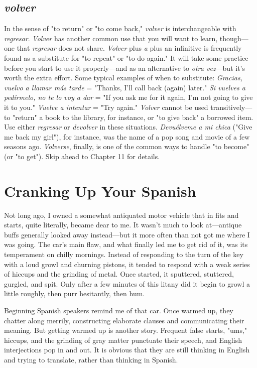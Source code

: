 \documentclass[14pt,a4paper,oneside]{memoir}
\begin{document}
\section{\emph{volver}}

In the sense of "to return" or "to come back," \emph{volver} is interchangeable with \emph{regresar}. \emph{Volver} has another common use that you
will want to learn, though---one that \emph{regresar} does not share. \emph{Volver}
plus \emph{a} plus an infinitive is frequently found as a substitute for "to repeat" or "to do again." It will take some practice before you start to
use it properly---and as an alternative to \emph{otra vez}---but it's worth the
extra effort. Some typical examples of when to substitute: \emph{Gracias,
	vuelvo a llamar más tarde} = "Thanks, I'll call back (again) later." \emph{Si
	vuelves a pedírmelo, no te lo voy a dar} = "If you ask me for it again,
I'm not going to give it to you." \emph{Vuelve a intentar} = "Try again."
\emph{Volver} cannot be used transitively---to "return" a book to the library, for
instance, or "to give back" a borrowed item. Use either \emph{regresar} or \emph{devolver} in these situations. \emph{Devuélveme a mi chica} ("Give me back my
girl"), for instance, was the name of a pop song and movie of a few seasons ago. \emph{Volverse}, finally, is one of the common ways to handle "to
become" (or "to get"). Skip ahead to Chapter 11 for details.

\chapter{Cranking Up Your Spanish}

Not long ago, I owned a somewhat antiquated motor vehicle
that in fits and starts, quite literally, became dear to me. It wasn't
much to look at---antique buffs generally looked away instead---but
it more often than not got me where I was going. The car's main flaw,
and what finally led me to get rid of it, was its temperament on chilly
mornings. Instead of responding to the turn of the key with a loud
growl and churning pistons, it tended to respond with a weak series of
hiccups and the grinding of metal. Once started, it sputtered, stuttered,
gurgled, and spit. Only after a few minutes of this litany did it begin to
growl a little roughly, then purr hesitantly, then hum.

Beginning Spanish speakers remind me of that car. Once
warmed up, they chatter along merrily, constructing elaborate clauses
and communicating their meaning. But getting warmed up is another
story. Frequent false starts, "ums," hiccups, and the grinding of gray
matter punctuate their speech, and English interjections pop in and
out. It is obvious that they are still thinking in English and trying to
translate, rather than thinking in Spanish.
\end{document}
